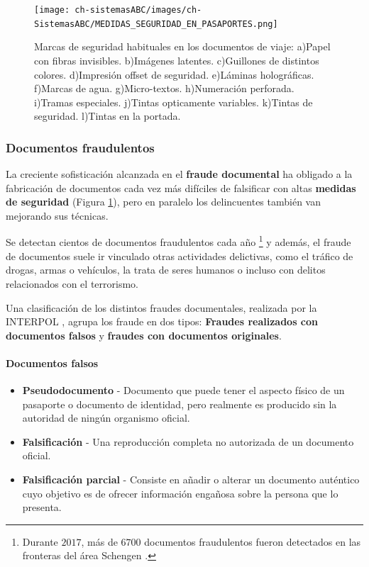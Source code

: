 \begin{figure}
  \centering
  \texttt{[image: ch-sistemasABC/images/ch-SistemasABC/MEDIDAS\_SEGURIDAD\_EN\_PASAPORTES.png]}
  \caption{Marcas de seguridad habituales en los documentos de viaje: a)Papel con fibras invisibles. b)Imágenes latentes. c)Guillones de distintos colores. d)Impresión offset de seguridad. e)Láminas holográficas. f)Marcas de agua. g)Micro-textos. h)Numeración perforada. i)Tramas especiales. j)Tintas opticamente variables. k)Tintas de seguridad. l)Tintas  en la portada.}
  \label{fig:MarcasSeguridadDocumentos}
\end{figure}

\subsubsection{Documentos fraudulentos}\label{subsec:FalsificacionDocumentosDeViaje}

La creciente sofisticación alcanzada en el \textbf{fraude documental} ha obligado a la fabricación de  documentos cada vez más difíciles de falsificar con altas \textbf{medidas de seguridad} (Figura \ref{fig:MarcasSeguridadDocumentos}), pero en paralelo los delincuentes también van mejorando sus técnicas.

Se detectan cientos de documentos fraudulentos cada año \footnote{Durante $2017$, más de $6700$ documentos fraudulentos fueron detectados en las fronteras del área \gls{Schengen} \cite{FRONTEX2019Risk}.} y además, el fraude de documentos suele ir vinculado otras actividades delictivas, como el tráfico de drogas, armas o vehículos, la trata de seres humanos o incluso con delitos relacionados con el terrorismo.

Una clasificación de los distintos fraudes documentales, realizada por la \gls{INTERPOL} \cite{INTERPOLOnline},  agrupa los fraude en dos tipos: \textbf{Fraudes realizados con documentos falsos} y \textbf{fraudes con documentos originales}. 

\paragraph{Documentos falsos}
\begin{itemize}
    \item
    \textbf{Pseudodocumento} - Documento que puede tener el aspecto físico de un pasaporte o documento de identidad, pero realmente es producido sin la autoridad de ningún organismo oficial.

    \item
    \textbf{Falsificación} - Una reproducción completa no autorizada de un documento oficial.
    
    \item
    \textbf{Falsificación parcial} - Consiste en añadir o alterar un documento auténtico cuyo objetivo es de ofrecer información engañosa sobre la persona que lo presenta.
\end{itemize}


